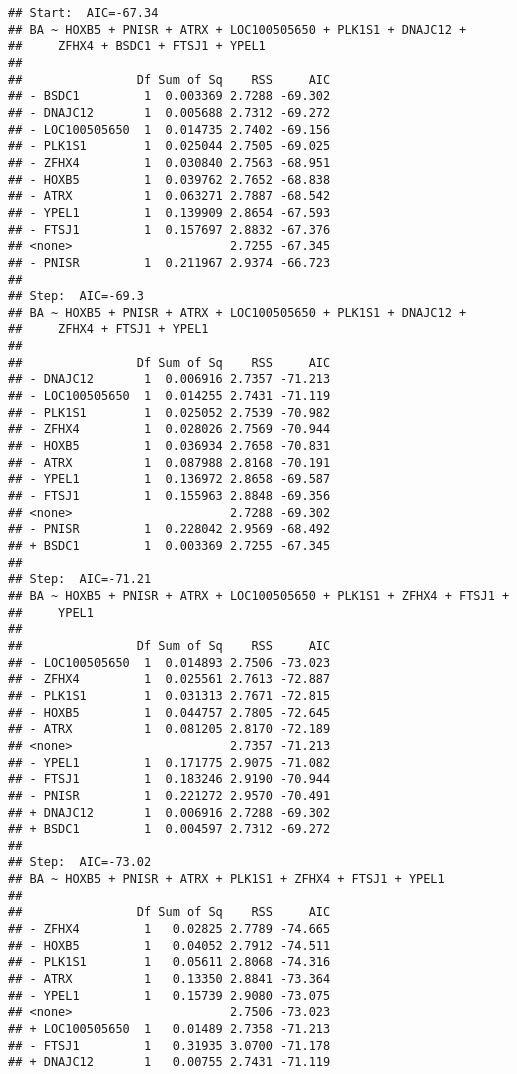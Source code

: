 \documentclass[12pt,dutch,coursenotes]{book}
\theoremstyle{definition}
\theoremstyle{definition}
\theoremstyle{definition}
\theoremstyle{remark}
\begin{document}
\begin{verbatim}
## Start:  AIC=-67.34
## BA ~ HOXB5 + PNISR + ATRX + LOC100505650 + PLK1S1 + DNAJC12 + 
##     ZFHX4 + BSDC1 + FTSJ1 + YPEL1
## 
##                Df Sum of Sq    RSS     AIC
## - BSDC1         1  0.003369 2.7288 -69.302
## - DNAJC12       1  0.005688 2.7312 -69.272
## - LOC100505650  1  0.014735 2.7402 -69.156
## - PLK1S1        1  0.025044 2.7505 -69.025
## - ZFHX4         1  0.030840 2.7563 -68.951
## - HOXB5         1  0.039762 2.7652 -68.838
## - ATRX          1  0.063271 2.7887 -68.542
## - YPEL1         1  0.139909 2.8654 -67.593
## - FTSJ1         1  0.157697 2.8832 -67.376
## <none>                      2.7255 -67.345
## - PNISR         1  0.211967 2.9374 -66.723
## 
## Step:  AIC=-69.3
## BA ~ HOXB5 + PNISR + ATRX + LOC100505650 + PLK1S1 + DNAJC12 + 
##     ZFHX4 + FTSJ1 + YPEL1
## 
##                Df Sum of Sq    RSS     AIC
## - DNAJC12       1  0.006916 2.7357 -71.213
## - LOC100505650  1  0.014255 2.7431 -71.119
## - PLK1S1        1  0.025052 2.7539 -70.982
## - ZFHX4         1  0.028026 2.7569 -70.944
## - HOXB5         1  0.036934 2.7658 -70.831
## - ATRX          1  0.087988 2.8168 -70.191
## - YPEL1         1  0.136972 2.8658 -69.587
## - FTSJ1         1  0.155963 2.8848 -69.356
## <none>                      2.7288 -69.302
## - PNISR         1  0.228042 2.9569 -68.492
## + BSDC1         1  0.003369 2.7255 -67.345
## 
## Step:  AIC=-71.21
## BA ~ HOXB5 + PNISR + ATRX + LOC100505650 + PLK1S1 + ZFHX4 + FTSJ1 + 
##     YPEL1
## 
##                Df Sum of Sq    RSS     AIC
## - LOC100505650  1  0.014893 2.7506 -73.023
## - ZFHX4         1  0.025561 2.7613 -72.887
## - PLK1S1        1  0.031313 2.7671 -72.815
## - HOXB5         1  0.044757 2.7805 -72.645
## - ATRX          1  0.081205 2.8170 -72.189
## <none>                      2.7357 -71.213
## - YPEL1         1  0.171775 2.9075 -71.082
## - FTSJ1         1  0.183246 2.9190 -70.944
## - PNISR         1  0.221272 2.9570 -70.491
## + DNAJC12       1  0.006916 2.7288 -69.302
## + BSDC1         1  0.004597 2.7312 -69.272
## 
## Step:  AIC=-73.02
## BA ~ HOXB5 + PNISR + ATRX + PLK1S1 + ZFHX4 + FTSJ1 + YPEL1
## 
##                Df Sum of Sq    RSS     AIC
## - ZFHX4         1   0.02825 2.7789 -74.665
## - HOXB5         1   0.04052 2.7912 -74.511
## - PLK1S1        1   0.05611 2.8068 -74.316
## - ATRX          1   0.13350 2.8841 -73.364
## - YPEL1         1   0.15739 2.9080 -73.075
## <none>                      2.7506 -73.023
## + LOC100505650  1   0.01489 2.7358 -71.213
## - FTSJ1         1   0.31935 3.0700 -71.178
## + DNAJC12       1   0.00755 2.7431 -71.119

\end{verbatim}
\end{document}
